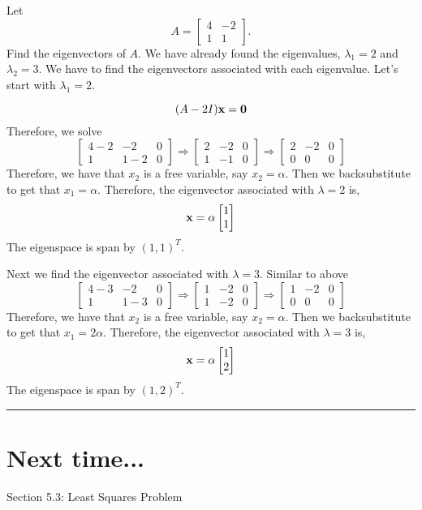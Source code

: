 \begin{example}
Let \[ A =  \begin{bmatrix} 4 & -2 \\ 1  & 1 \end{bmatrix}. \]
Find the eigenvectors of $A$.  We have already found the eigenvalues, $\lambda_1 = 2$ and $\lambda_2=3$.  We have to find the eigenvectors associated with each eigenvalue.  Let's start with $\lambda_1 = 2$.

\[  (A - 2I) {\bf x} = {\bf 0} \]
Therefore, we solve
\[   
\begin{bmatrix} 4-2 & -2 & 0 \\ 1  & 1-2 & 0   \end{bmatrix}  \Rightarrow \begin{bmatrix} 2 & -2 & 0 \\ 1  & -1 & 0   \end{bmatrix}  \Rightarrow \begin{bmatrix} 2 & -2 & 0 \\ 0  & 0 & 0   \end{bmatrix}
\]
Therefore, we have that $x_2$ is a free variable, say $x_2 = \alpha$.  Then we backsubstitute to get that $x_1 = \alpha$.  Therefore, the eigenvector associated with $\lambda  = 2 $ is, 
\[  {\bf x} = \alpha  \begin{bmatrix} 1 \\ 1   \end{bmatrix} \]
The eigenspace  is span by $(1,1)^T$.



Next we find the eigenvector associated with $\lambda = 3$.  Similar to above
\[   
\begin{bmatrix} 4-3 & -2 & 0 \\ 1  & 1-3 & 0   \end{bmatrix}  \Rightarrow \begin{bmatrix} 1 & -2 & 0 \\ 1  & -2 & 0   \end{bmatrix}  \Rightarrow \begin{bmatrix} 1 & -2 & 0 \\ 0  & 0 & 0   \end{bmatrix}
\]
Therefore, we have that $x_2$ is a free variable, say $x_2 = \alpha$.  Then we backsubstitute to get that $x_1 = 2\alpha$.  Therefore, the eigenvector associated with $\lambda  = 3 $ is, 
\[  {\bf x} = \alpha  \begin{bmatrix} 1 \\ 2   \end{bmatrix} \]
The eigenspace  is span by $(1,2)^T$.

\end{example}

\rule[0.01in]{\textwidth}{0.0025in}










\section*{Next time...}
Section 5.3: Least Squares Problem

